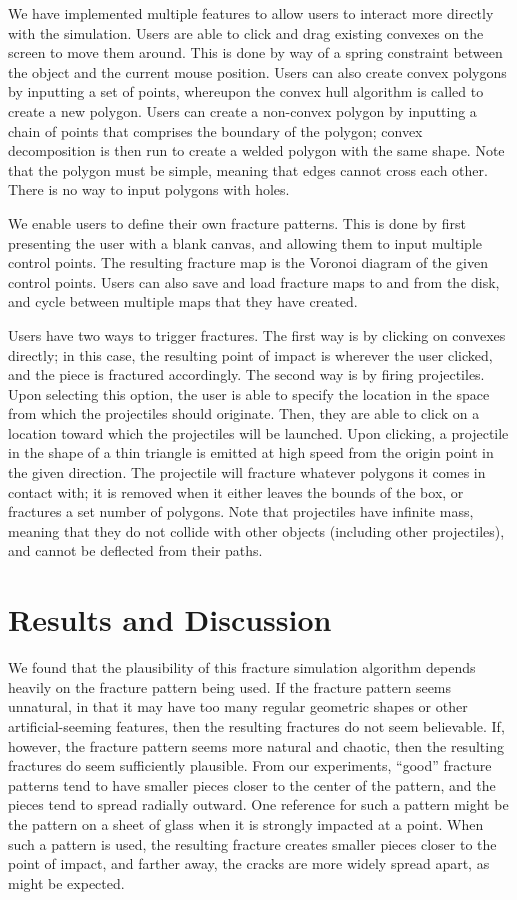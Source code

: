 \documentclass[tog]{acmsiggraph}
\begin{document}
We have implemented multiple features to allow users to interact more
directly with the simulation. Users are able to click and drag
existing convexes on the screen to move them around. This is done by
way of a spring constraint between the object and the current mouse
position. Users can also create convex polygons by inputting a set of
points, whereupon the convex hull algorithm is called to create a new
polygon. Users can create a non-convex polygon by inputting a chain of
points that comprises the boundary of the polygon; convex
decomposition is then run to create a welded polygon with the same
shape. Note that the polygon must be simple, meaning that edges cannot
cross each other. There is no way to input polygons with holes.

We enable users to define their own fracture patterns. This is done by
first presenting the user with a blank canvas, and allowing them to
input multiple control points. The resulting fracture map is the
Voronoi diagram of the given control points. Users can also save and
load fracture maps to and from the disk, and cycle between multiple
maps that they have created.

Users have two ways to trigger fractures. The first way is by clicking
on convexes directly; in this case, the resulting point of impact is
wherever the user clicked, and the piece is fractured accordingly. The
second way is by firing projectiles. Upon selecting this option, the
user is able to specify the location in the space from which the
projectiles should originate. Then, they are able to click on a
location toward which the projectiles will be launched. Upon clicking,
a projectile in the shape of a thin triangle is emitted at high speed
from the origin point in the given direction. The projectile will
fracture whatever polygons it comes in contact with; it is removed
when it either leaves the bounds of the box, or fractures a set number
of polygons. Note that projectiles have infinite mass, meaning that
they do not collide with other objects (including other projectiles),
and cannot be deflected from their paths.

\section{Results and Discussion}

We found that the plausibility of this fracture simulation algorithm
depends heavily on the fracture pattern being used. If the fracture
pattern seems unnatural, in that it may have too many regular
geometric shapes or other artificial-seeming features, then the
resulting fractures do not seem believable. If, however, the fracture
pattern seems more natural and chaotic, then the resulting fractures
do seem sufficiently plausible. From our experiments, ``good'' fracture
patterns tend to have smaller pieces closer to the center of the
pattern, and the pieces tend to spread radially outward. One reference
for such a pattern might be the pattern on a sheet of glass when it is
strongly impacted at a point. When such a pattern is used, the
resulting fracture creates smaller pieces closer to the point of
impact, and farther away, the cracks are more widely spread apart, as
might be expected.
\end{document}
